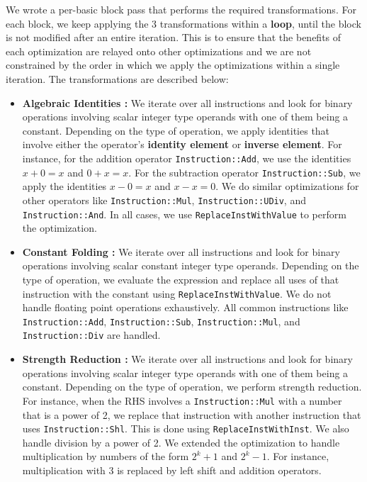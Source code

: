 We wrote a per-basic block pass that performs the required transformations. For each block, we keep
applying the 3 transformations within a \textbf{loop}, until the block is not modified after an entire iteration.
This is to ensure that the benefits of each optimization are relayed onto other optimizations and we
are not constrained by the order in which we apply the optimizations within a single iteration.
The transformations are described below:

\begin{itemize}
\item{\textbf{Algebraic Identities :}}
  We iterate over all instructions and look for binary operations involving scalar integer type operands with
  one of them being a constant.
  Depending on the type of operation, we apply identities that involve either the operator's \textbf{identity element} or
  \textbf{inverse element}. For instance, for the addition operator \texttt{Instruction::Add}, we use the identities
  $x + 0 = x$ and $0 + x = x$. For the subtraction operator \texttt{Instruction::Sub}, we apply the identities
  $x - 0 = x$ and $x - x = 0$. We do similar optimizations for other operators like  \texttt{Instruction::Mul},
  \texttt{Instruction::UDiv}, and  \texttt{Instruction::And}. In all cases, we use \texttt{ReplaceInstWithValue}
  to perform the optimization.
  
\item{\textbf{Constant Folding :}}
  We iterate over all instructions and look for binary operations involving scalar constant integer type operands.
  Depending on the type of operation, we evaluate the expression and replace all uses of that instruction with the
  constant using \texttt{ReplaceInstWithValue}. We do not handle floating point operations exhaustively.
  All common instructions like \texttt{Instruction::Add}, \texttt{Instruction::Sub}, \texttt{Instruction::Mul}, and
  \texttt{Instruction::Div} are handled.
  
\item{\textbf{Strength Reduction :}}
  We iterate over all instructions and look for binary operations involving scalar integer type operands with
  one of them being a constant.
  Depending on the type of operation, we perform strength reduction. For instance, when the RHS involves a
  \texttt{Instruction::Mul} with a number that is a power of 2, we replace that instruction with another instruction
  that uses \texttt{Instruction::Shl}. This is done using \texttt{ReplaceInstWithInst}. We also handle
  division by a power of 2. We extended the optimization to handle multiplication by numbers of the form $2^{k} + 1$
  and $2^{k} - 1$. For instance, multiplication with 3 is replaced by left shift and addition operators.  
  
\end{itemize}

